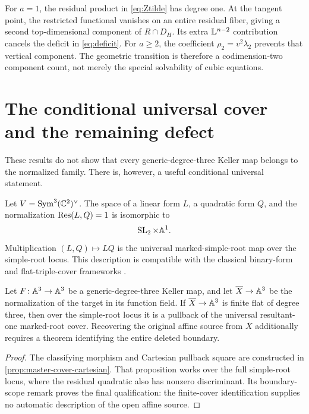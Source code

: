 \documentclass[11pt,reqno]{amsart}
\begin{document}
\begin{remark}
For \(a=1\), the residual product in \eqref{eq:Ztilde} has degree one.  At
the tangent point, the restricted functional vanishes on an entire residual
fiber, giving a second top-dimensional component of \(R\cap D_H\).  Its
extra \(\mathbb L^{n-2}\) contribution cancels the deficit in
\eqref{eq:deficit}.  For \(a\ge2\), the coefficient
\(\rho_2=v^2\lambda_2\) prevents that vertical component.  The geometric
transition is therefore a codimension-two component count, not merely the
special solvability of cubic equations.
\end{remark}

\section{The conditional universal cover and the remaining defect}
\label{sec:universal}

These results do not show that every generic-degree-three Keller map belongs
to the normalized family.  There is, however, a useful conditional universal
statement.

Let \(V=\operatorname{Sym}^3(\mathbb C^2)^\vee\).  The space of a linear form \(L\), a quadratic
form \(Q\), and the normalization \(\operatorname{Res}(L,Q)=1\) is isomorphic to
\[
\operatorname{SL}_2\times\mathbb A^1.
\]
Multiplication \((L,Q)\mapsto LQ\) is the universal marked-simple-root map
over the simple-root locus.  This description is compatible with the
classical binary-form and flat-triple-cover frameworks
\cite{miranda1985,wood2011}.

\begin{proposition}
\label{prop:conditional-master}
Let \(F\colon\mathbb A^3\to\mathbb A^3\) be a generic-degree-three Keller map, and let
\(\overline X\to\mathbb A^3\) be the normalization of the target in its function
field.  If \(\overline X\to\mathbb A^3\) is finite flat of degree three, then over
the simple-root locus it is a pullback of the universal
resultant-one marked-root cover.  Recovering the original affine source from
\(\overline X\) additionally requires a theorem identifying the entire
deleted boundary.
\end{proposition}

\begin{proof}
The classifying morphism and Cartesian pullback square are constructed in
\cref{prop:master-cover-cartesian}.  That proposition works over the full
simple-root locus, where the residual quadratic also has nonzero
discriminant.  Its boundary-scope remark proves the final qualification:
the finite-cover identification supplies no automatic description of the
open affine source.
\end{proof}
\end{document}
